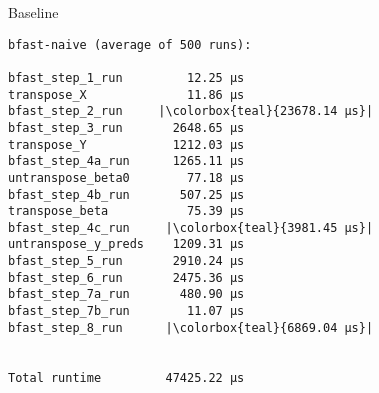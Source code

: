 \begin{frame}[fragile]{Baseline}
%

    \begin{verbatim}
bfast-naive (average of 500 runs):

bfast_step_1_run         12.25 µs
transpose_X              11.86 µs
bfast_step_2_run     |\colorbox{teal}{23678.14 µs}|
bfast_step_3_run       2648.65 µs
transpose_Y            1212.03 µs
bfast_step_4a_run      1265.11 µs
untranspose_beta0        77.18 µs
bfast_step_4b_run       507.25 µs
transpose_beta           75.39 µs
bfast_step_4c_run     |\colorbox{teal}{3981.45 µs}|
untranspose_y_preds    1209.31 µs
bfast_step_5_run       2910.24 µs
bfast_step_6_run       2475.36 µs
bfast_step_7a_run       480.90 µs
bfast_step_7b_run        11.07 µs
bfast_step_8_run      |\colorbox{teal}{6869.04 µs}|


Total runtime         47425.22 µs
\end{verbatim}

\end{frame}


